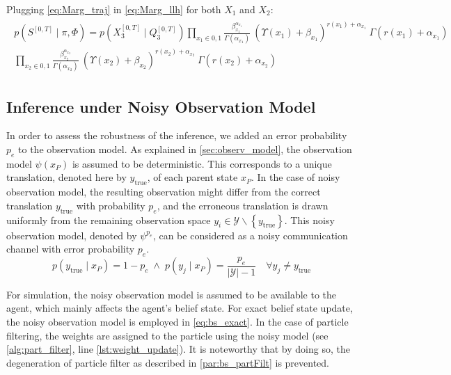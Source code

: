 Plugging \autoref{eq:Marg_traj} in \autoref{eq:Marg_llh} for both $ X_{1} $ and $ X_{2} $:
\begin{align}
\begin{split}
p(S^{[0,T]} \mid \pi, \Phi ) = p(X_{3}^{[0, T]}\mid Q_{3}^{[0, T]}) \prod_{x_{1}\in{0,1}} \frac{\beta_{x_{1}}^{\alpha_{x_{1}}}}{\Gamma(\alpha_{x_{1}})} \ (\Upsilon(x_{1})+\beta_{x_{1}})^{r(x_{1}) + \alpha_{x_{1}}}\ \Gamma(r(x_{1}) + \alpha_{x_{1}})  \\  \prod_{x_{2}\in{0,1}} \frac{\beta_{x_{2}}^{\alpha_{x_{2}}}}{\Gamma(\alpha_{x_{2}})} \ (\Upsilon(x_{2})+\beta_{x_{2}})^{{r(x_2)} + \alpha_{x_{2}}}\ \Gamma(r(x_2) + \alpha_{x_{2}})
\label{eq:Marg_llh_final}
\end{split}
\end{align}

\subsection{Inference under Noisy Observation Model}
\label{sec:noisy_robustness}
In order to assess the robustness of the inference, we added an error probability $ p_e $ to the observation model. As explained in \cref{sec:observ_model}, the observation model $ \psi(x_P) $ is assumed to be deterministic. This corresponds to a unique translation, denoted here by $ y_\text{true} $, of each parent state $ x_P $. In the case of noisy observation model, the resulting observation might differ from the correct translation $ y_\text{true} $ with probability $ p_e $, and the erroneous translation is drawn uniformly from the remaining observation space $ y_i \in \mathcal{Y} \backslash \left\lbrace y_\text{true}\right\rbrace $. This noisy observation model, denoted by $ \psi^{p_e} $, can be considered as a noisy communication channel with error probability $ p_e $. 
\begin{equation}
p(y_\text{true} \mid x_P) = 1-p_e \;\wedge \;p(y_j \mid x_P) = \frac{p_e}{|\mathcal{Y}|-1} \quad \forall y_j \neq y_\text{true}
\label{eq:noicy_obs_model}
\end{equation} \par
For simulation, the noisy observation model is assumed to be available to the agent, which mainly affects the agent's belief state. For exact belief state update, the noisy observation model is employed in \autoref{eq:bs_exact}. In the case of particle filtering, the weights are assigned to the particle using the noisy model (see \cref{alg:part_filter}, line \autoref{lst:weight_update}). It is noteworthy that by doing so, the degeneration of particle filter as described in \cref{par:bs_partFilt} is prevented.
